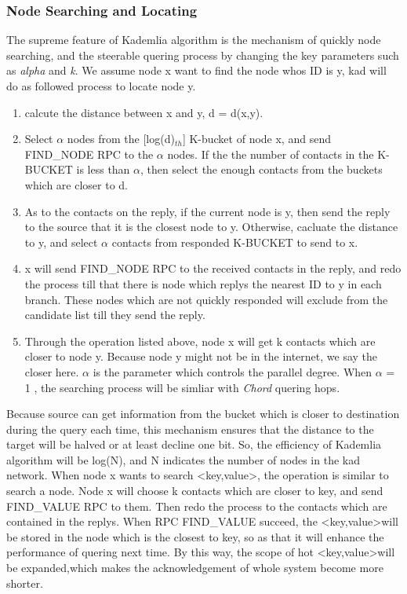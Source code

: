 \subsubsection{Node Searching and Locating}
{
The supreme feature of Kademlia algorithm is the mechanism of quickly node searching, and the steerable quering process by changing the key parameters such as \emph{alpha} and \emph{k}.
We assume node x want to find the node whos ID is y,  kad will do as followed process to locate node y.
\begin{enumerate}
\item calcute the distance between x and y, d = d(x,y).
\item Select $\alpha$ nodes from the [log(d)$_{th}$] K-bucket of node x, and send FIND\_NODE RPC to the $\alpha$ nodes. If the the number of contacts in the K-BUCKET is less than $\alpha$, then select the enough contacts from the buckets which are closer to d.
\item As to the contacts on the reply, if the current node is y, then send the reply to the source that it is the closest node to y. Otherwise, cacluate the distance to y, and select $\alpha$ contacts from responded K-BUCKET to send to x.
\item x will send FIND\_NODE RPC to the received contacts in the reply, and redo the process till that there is node which replys the nearest ID to y in each branch. These nodes which are not quickly responded will exclude from the candidate list till they send the reply.
\item Through the operation listed above, node x will get k contacts which are closer to node y. 
Because node y might not be in the internet, we say the closer here.  $\alpha$ is the parameter which controls the parallel degree. When $\alpha$ = 1 , the searching process will be simliar with \emph{Chord} quering hops.
\end{enumerate}

Because source can get information from the bucket which is closer to destination during the query each time, this mechanism ensures that the distance to the target will be halved or at least decline one bit.
So, the efficiency of Kademlia algorithm will be log(N), and N indicates the number of nodes in the kad network.
When node x wants to search \textless key,value\textgreater, the operation is similar to search a node.
Node x will choose k contacts which are closer to key, and send FIND\_VALUE RPC to them. Then redo the process to the contacts which are contained in the replys.
When RPC FIND\_VALUE succeed, the \textless key,value\textgreater will be stored in the node which is the closest to key, so as that it will enhance the performance of quering next time.
By this way, the scope of hot \textless key,value\textgreater will be expanded,which makes the acknowledgement of whole system become more shorter.
}

